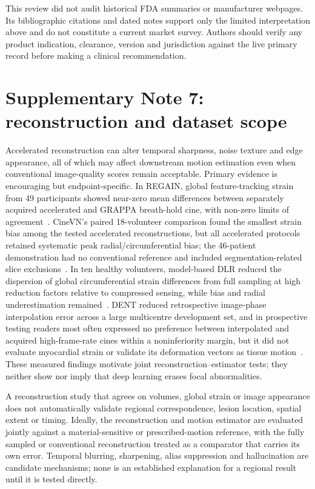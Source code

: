 \documentclass[11pt,a4paper]{article}
\begin{document}
This review did not audit historical FDA summaries or manufacturer webpages. Its bibliographic citations and dated notes support only the limited interpretation above and do not constitute a current market survey. Authors should verify any product indication, clearance, version and jurisdiction against the live primary record before making a clinical recommendation.

\section*{Supplementary Note 7: reconstruction and dataset scope}

Accelerated reconstruction can alter temporal sharpness, noise texture and edge appearance, all of which may affect downstream motion estimation even when conventional image-quality scores remain acceptable. Primary evidence is encouraging but endpoint-specific. In REGAIN, global feature-tracking strain from 49 participants showed near-zero mean differences between separately acquired accelerated and GRAPPA breath-hold cine, with non-zero limits of agreement~\cite{yoon2023regain}. CineVN's paired 18-volunteer comparison found the smallest strain bias among the tested accelerated reconstructions, but all accelerated protocols retained systematic peak radial/circumferential bias; the 46-patient demonstration had no conventional reference and included segmentation-related slice exclusions~\cite{vornehm2024cinevn}. In ten healthy volunteers, model-based DLR reduced the dispersion of global circumferential strain differences from full sampling at high reduction factors relative to compressed sensing, while bias and radial underestimation remained~\cite{tsuneta2025dlr}. DENT reduced retrospective image-phase interpolation error across a large multicentre development set, and in prospective testing readers most often expressed no preference between interpolated and acquired high-frame-rate cines within a noninferiority margin, but it did not evaluate myocardial strain or validate its deformation vectors as tissue motion~\cite{morales2024dent}. These measured findings motivate joint reconstruction--estimator tests; they neither show nor imply that deep learning erases focal abnormalities.

A reconstruction study that agrees on volumes, global strain or image appearance does not automatically validate regional correspondence, lesion location, spatial extent or timing. Ideally, the reconstruction and motion estimator are evaluated jointly against a material-sensitive or prescribed-motion reference, with the fully sampled or conventional reconstruction treated as a comparator that carries its own error. Temporal blurring, sharpening, alias suppression and hallucination are candidate mechanisms; none is an established explanation for a regional result until it is tested directly.
\end{document}
